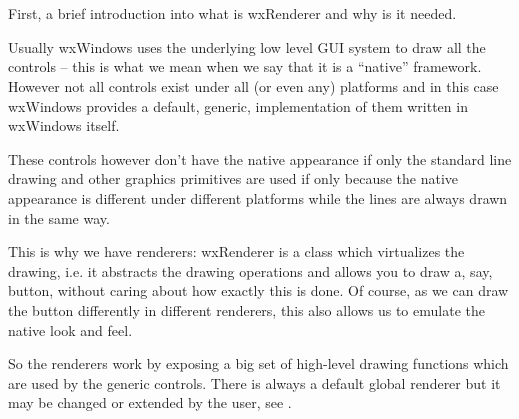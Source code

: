 
\section{}\label{wxrenderer}

First, a brief introduction into what is wxRenderer and why is it needed.

Usually wxWindows uses the underlying low level GUI system to draw all the
controls -- this is what we mean when we say that it is a ``native'' framework.
However not all controls exist under all (or even any) platforms and in this
case wxWindows provides a default, generic, implementation of them written in
wxWindows itself.

These controls however don't have the native appearance if only the standard
line drawing and other graphics primitives are used if only because the native
appearance is different under different platforms while the lines are always
drawn in the same way.

This is why we have renderers: wxRenderer is a class which virtualizes the
drawing, i.e. it abstracts the drawing operations and allows you to draw a,
say, button, without caring about how exactly this is done. Of course, as we
can draw the button differently in different renderers, this also allows us to
emulate the native look and feel.


So the renderers work by exposing a big set of high-level drawing functions
which are used by the generic controls. There is always a default global
renderer but it may be changed or extended by the user, see 
.


